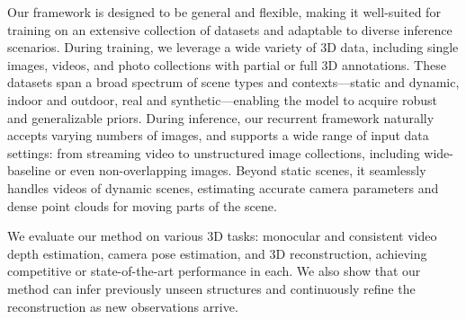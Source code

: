 Our framework is designed to be general and flexible, making it well-suited for training on an extensive collection of datasets and adaptable to diverse inference scenarios. During training, we leverage a wide variety of 3D data, including single images, videos, and photo collections with partial or full 3D annotations. These datasets span a broad spectrum of scene types and contexts—static and dynamic, indoor and outdoor, real and synthetic—enabling the model to acquire robust and generalizable priors. During inference,  our recurrent framework naturally accepts varying numbers of images, and supports a wide range of input data settings: from streaming video to unstructured image collections, including wide-baseline or even non-overlapping images. Beyond static scenes, it seamlessly handles videos of dynamic scenes, estimating accurate camera parameters and dense point clouds for moving parts of the scene. 

We evaluate our method on various 3D tasks: monocular and consistent video depth estimation, camera pose estimation, and 3D reconstruction, achieving competitive or state-of-the-art performance in each. We also show that our method can infer previously unseen structures and continuously refine the reconstruction as new observations arrive.




















